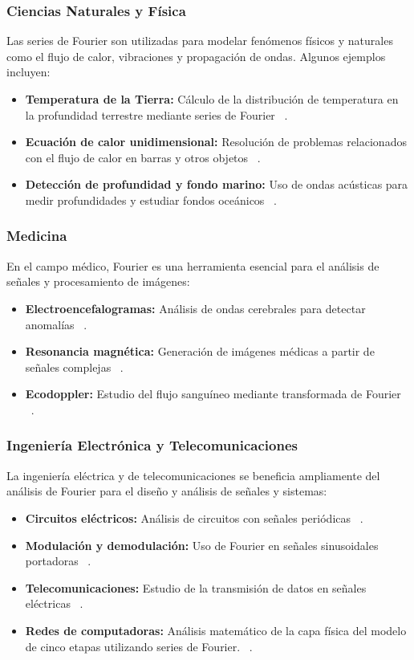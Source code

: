 \subsubsection{Ciencias Naturales y Física}
Las series de Fourier son utilizadas para modelar fenómenos físicos y naturales como el flujo de calor, vibraciones y propagación de ondas. Algunos ejemplos incluyen:
\begin{itemize}
	\item \textbf{Temperatura de la Tierra:} Cálculo de la distribución de temperatura en la profundidad terrestre mediante series de Fourier ~\cite{repositorioFourierARG}. 
	\item \textbf{Ecuación de calor unidimensional:} Resolución de problemas relacionados con el flujo de calor en barras y otros objetos ~\cite{repositorioFourierARG}. 
	\item \textbf{Detección de profundidad y fondo marino:} Uso de ondas acústicas para medir profundidades y estudiar fondos oceánicos ~\cite{repositorioFourierARG}. 
\end{itemize}

\subsubsection{Medicina}
En el campo médico, Fourier es una herramienta esencial para el análisis de señales y procesamiento de imágenes:
\begin{itemize}
	\item \textbf{Electroencefalogramas:} Análisis de ondas cerebrales para detectar anomalías ~\cite{repositorioFourierARG}. 
	\item \textbf{Resonancia magnética:} Generación de imágenes médicas a partir de señales complejas ~\cite{repositorioFourierARG}. 
	\item \textbf{Ecodoppler:} Estudio del flujo sanguíneo mediante transformada de Fourier ~\cite{repositorioFourierARG}. 
\end{itemize}

\subsubsection{Ingeniería Electrónica y Telecomunicaciones}
La ingeniería eléctrica y de telecomunicaciones se beneficia ampliamente del análisis de Fourier para el diseño y análisis de señales y sistemas:
\begin{itemize}
	\item \textbf{Circuitos eléctricos:} Análisis de circuitos con señales periódicas ~\cite{repositorioFourierARG}. 
	\item \textbf{Modulación y demodulación:} Uso de Fourier en señales sinusoidales portadoras ~\cite{repositorioFourierARG}. 
	\item \textbf{Telecomunicaciones:} Estudio de la transmisión de datos en señales eléctricas ~\cite{repositorioFourierARG}. 
	\item \textbf{Redes de computadoras:} Análisis matemático de la capa física del modelo de cinco etapas utilizando series de Fourier.  ~\cite{repositorioFourierARG}. 
\end{itemize}

